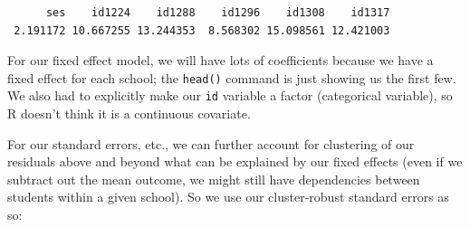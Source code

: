 \documentclass[
  letterpaper,
  DIV=11,
  numbers=noendperiod]{scrreprt}
\newenvironment{Shaded}{\begin{snugshade}}{\end{snugshade}}
\newcommand{\AttributeTok}[1]{\textcolor[rgb]{0.49,0.56,0.16}{#1}}
\newcommand{\DecValTok}[1]{\textcolor[rgb]{0.25,0.63,0.44}{#1}}
\newcommand{\FunctionTok}[1]{\textcolor[rgb]{0.02,0.16,0.49}{#1}}
\newcommand{\NormalTok}[1]{\textcolor[rgb]{0.00,0.44,0.13}{#1}}
\newcommand{\OtherTok}[1]{\textcolor[rgb]{0.00,0.44,0.13}{#1}}
\newcommand{\SpecialCharTok}[1]{\textcolor[rgb]{0.25,0.44,0.63}{#1}}
\begin{document}
\begin{Shaded}
\end{Shaded}

\begin{verbatim}
      ses    id1224    id1288    id1296    id1308    id1317 
 2.191172 10.667255 13.244353  8.568302 15.098561 12.421003 
\end{verbatim}

For our fixed effect model, we will have lots of coefficients because we
have a fixed effect for each school; the \texttt{head()} command is just
showing us the first few. We also had to explicitly make our \texttt{id}
variable a factor (categorical variable), so R doesn't think it is a
continuous covariate.

For our standard errors, etc., we can further account for clustering of
our residuals above and beyond what can be explained by our fixed
effects (even if we subtract out the mean outcome, we might still have
dependencies between students within a given school). So we use our
cluster-robust standard errors as so:

\begin{Shaded}
\end{Shaded}
\end{document}
